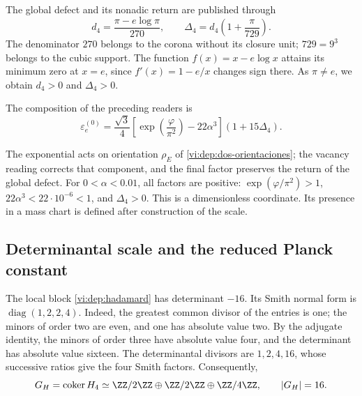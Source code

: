 The global defect and its nonadic return are published through
\begin{equation}
 d_4=\frac{\pi-e\log\pi}{270},\qquad
 \Delta_4=d_4\left(1+\frac{\pi}{729}\right).
 \label{vi:dep:delta4}
\end{equation}
The denominator \(270\) belongs to the corona without its closure
unit; \(729=9^3\) belongs to the cubic support. The function
\(f(x)=x-e\log x\) attains its minimum zero at \(x=e\), since
\(f'(x)=1-e/x\) changes sign there. As \(\pi\ne e\),
we obtain \(d_4>0\) and \(\Delta_4>0\).

\begin{definition}
\label{vi:dep:electron-basal}
The composition of the preceding readers is
\begin{equation}
 \varepsilon_e^{(0)}=
 \frac{\sqrt3}{4}
 \left[\exp\left(\frac{\varphi}{\pi^2}\right)-22\alpha^3\right]
 (1+15\Delta_4).
 \label{vi:dep:formula-basal}
\end{equation}
\end{definition}
The exponential acts on orientation \(\rho_E\) of
\eqref{vi:dep:dos-orientaciones}; the vacancy reading corrects that
component, and the final factor preserves the return of the global defect.
For \(0<\alpha<0.01\), all factors are positive:
\(\exp(\varphi/\pi^2)>1\), \(22\alpha^3<22\cdot10^{-6}<1\),
and \(\Delta_4>0\). This is a dimensionless coordinate. Its presence
in a mass chart is defined after construction of the scale.

\subsection{Determinantal scale and the reduced Planck constant}
\label{vi:dep:planck}

The local block \eqref{vi:dep:hadamard} has determinant \(-16\).
Its Smith normal form is \(\operatorname{diag}(1,2,2,4)\).
Indeed, the greatest common divisor of the entries is one; the minors of
order two are even, and one has absolute value two. By the adjugate identity,
the minors of order three have absolute value four,
and the determinant has absolute value sixteen. The determinantal
divisors are \(1,2,4,16\), whose successive ratios give the
four Smith factors. Consequently,
\begin{equation}
 G_H=\operatorname{coker}H_4
 \simeq\ZZ/2\ZZ\oplus\ZZ/2\ZZ\oplus\ZZ/4\ZZ,
 \qquad |G_H|=16.
 \label{vi:dep:conucleo}
\end{equation}

